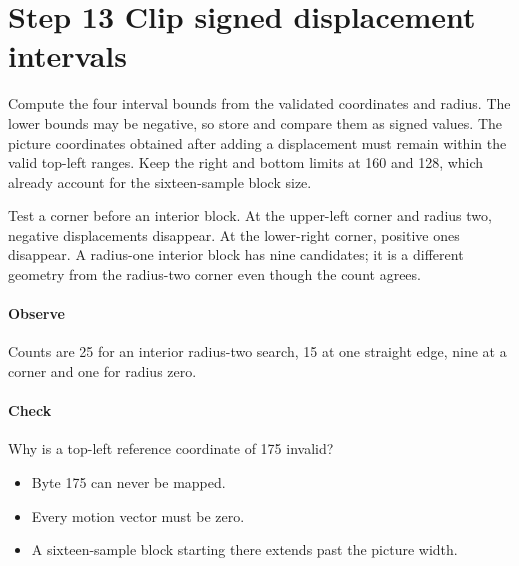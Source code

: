 \section{Step 13 Clip signed displacement intervals}\label{h263-motion-s03}
Compute the four interval bounds from the validated coordinates and radius.
The lower bounds may be negative, so store and compare them as signed values.
The picture coordinates obtained after adding a displacement must remain within
the valid top-left ranges. Keep the right and bottom limits at 160 and 128,
which already account for the sixteen-sample block size.

Test a corner before an interior block. At the upper-left corner and radius two,
negative displacements disappear. At the lower-right corner, positive ones
disappear. A radius-one interior block has nine candidates; it is a different
geometry from the radius-two corner even though the count agrees.

\paragraph{Observe} Counts are 25 for an interior radius-two search, 15 at one
straight edge, nine at a corner and one for radius zero.
\paragraph{Check} Why is a top-left reference coordinate of 175 invalid?
\begin{itemize}
  \item[A.] Byte 175 can never be mapped.
  \item[B.] Every motion vector must be zero.
  \item[C.] A sixteen-sample block starting there extends past the picture width.
\end{itemize}
